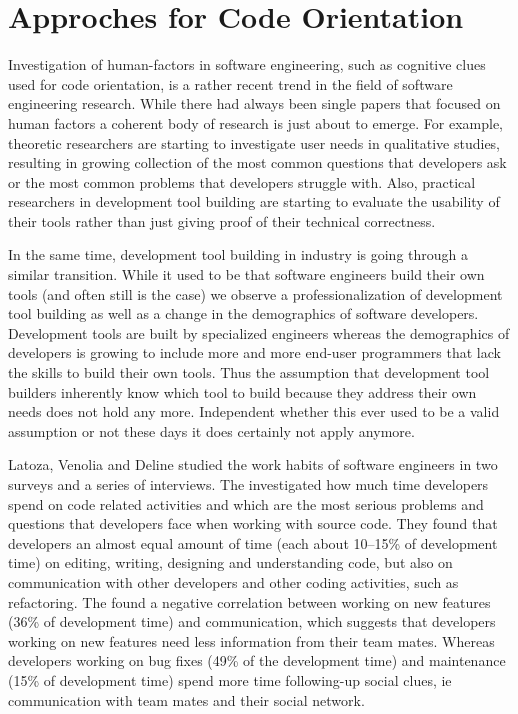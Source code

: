 \chapter{Approches for Code Orientation}
\label{the chapter on related work}

Investigation of human-factors in software engineering, such as cognitive clues used for code orientation, is a rather recent trend in the field of software engineering research. While there had always been single papers that focused on human factors a coherent body of research is just about to emerge. For example, theoretic researchers are starting to investigate user needs in qualitative studies, resulting in growing collection of the most common questions that developers ask or the most common problems that developers struggle with. Also, practical researchers in development tool building are starting to evaluate the usability of their tools rather than just giving proof of their technical correctness. 

In the same time, development tool building in industry is going through a similar transition. While it used to be that software engineers build their own tools (and often still is the case) we observe a professionalization of development tool building as well as a change in the demographics of software developers. Development tools are built by specialized engineers whereas the demographics of developers is growing to include more and more end-user programmers that lack the skills to build their own tools. Thus the assumption that development tool builders inherently know which tool to build because they address their own needs does not hold any more. Independent whether this ever used to be a valid assumption or not these days it does certainly not apply anymore.

Latoza, Venolia and Deline \cite{Lato06a} studied the work habits of software engineers in two surveys and a series of interviews. The investigated how much time developers spend on code related activities and which are the most serious problems and questions that developers face when working with source code. They found that developers an almost equal amount of time (\ie each about 10--15\% of development time) on editing, writing, designing and understanding code, but also on communication with other developers and other coding activities, such as refactoring. The found a negative correlation between working on new features (36\% of development time) and communication, which suggests that developers working on new features need less information from their team mates. Whereas developers working on bug fixes (49\% of the development time) and maintenance (15\% of development time) spend more time following-up social clues, ie communication with team mates and their social network. 

